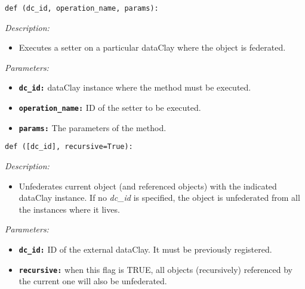 
\begin{dBox}
\texttt{def (dc\_id, \newline operation\_name, params):}
\LINE

{\it Description:}

\begin{itemize}
  \item Executes a setter on a particular dataClay where the object is federated.
\end{itemize}

{\it Parameters:}

\begin{itemize}
  \item \texttt{\bfseries dc\_id:} dataClay instance where the method must be executed.
  \item \texttt{\bfseries operation\_name:} ID of the setter to be executed.
  \item \texttt{\bfseries params:} The parameters of the method.
\end{itemize}
 
\end{dBox}

\begin{dBox}

\texttt{def ([dc\_id], recursive=True):}
\LINE

{\it Description:}

\begin{itemize}
  \item Unfederates current object (and referenced objects) with the indicated dataClay instance. If no \textit{dc\_id} is specified, the object is unfederated from all the instances where it lives.
\end{itemize}

{\it Parameters:}

\begin{itemize}
  \item \texttt{\bfseries dc\_id:} ID of the external dataClay. It must be previously registered.
  \item \texttt{\bfseries recursive:} when this flag is TRUE, all objects (recursively) referenced by the current one will also be unfederated.
\end{itemize}

\end{dBox}






